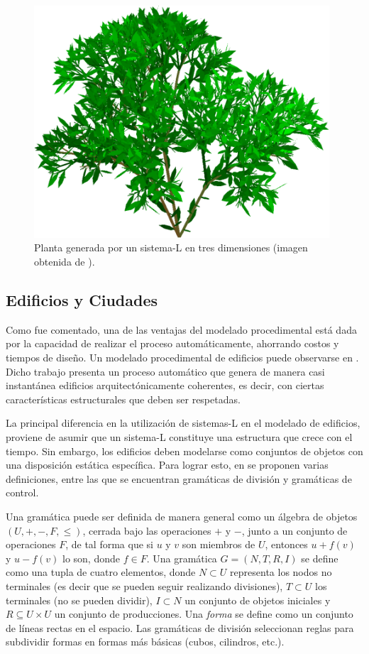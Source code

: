 \begin{figure}
\center
\includegraphics[width=11cm]{figures/3dlsystem}
\caption[Sistema-L en tres dimensiones.]{Planta generada por un sistema-L en tres dimensiones (imagen obtenida de \cite{Prusinkiewicz1990}).}
\label{fg:sistemasL3D}
\end{figure}

\subsection{Edificios y Ciudades}
Como fue comentado, una de las ventajas del modelado procedimental está dada por la capacidad de realizar el proceso automáticamente, ahorrando costos y tiempos de diseño.
Un modelado procedimental de edificios puede observarse en \cite{Wonka2003}.
Dicho trabajo presenta un proceso automático que genera de manera casi instantánea edificios arquitectónicamente coherentes, es decir, con ciertas características estructurales que deben ser respetadas.

La principal diferencia en la utilización de sistemas-L en el modelado de edificios, proviene de asumir que un sistema-L constituye una estructura que crece con el tiempo.
Sin embargo, los edificios deben modelarse como conjuntos de objetos con una disposición estática específica.
Para lograr esto, en \cite{Wonka2003} se proponen varias definiciones, entre las que se encuentran gramáticas de división y gramáticas de control.

Una gramática puede ser definida de manera general como un álgebra de objetos $(U,+,-,F,\leq)$, cerrada bajo las operaciones $+$ y $-$, junto a un conjunto de operaciones $F$, de tal forma que si $u$ y $v$ son miembros de $U$, entonces $u+f(v)$ y $u-f(v)$ lo son, donde $f \in F$.
Una gramática $G=(N,T,R,I)$ se define como una tupla de cuatro elementos, donde $N \subset U$ representa los nodos no terminales (es decir que se pueden seguir realizando divisiones), $T \subset U$ los terminales (no se pueden dividir), $I \subset N$ un conjunto de objetos iniciales y $R \subseteq U \times U$ un conjunto de producciones.
Una {\em forma} se define como un conjunto de líneas rectas en el espacio.
Las gramáticas de división seleccionan reglas para subdividir formas en formas más básicas (cubos, cilindros, etc.).

